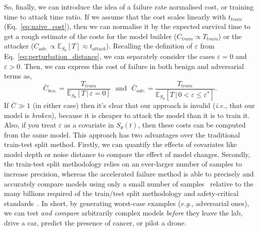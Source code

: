 So, finally, we can introduce the idea of a failure rate normalised cost, or training time to attack time ratio. If we assume that the cost scales linearly with $t_{train}$ (Eq.~\ref{eq:naive_cost}), then we can normalise it by the expected survival time to get a rough estimate of the costs for the model builder ($C_{train} \propto T_{train}$) or the attacker ($C_{adv.} \propto \mathbb{E}_{S_\theta}[T] \approx t_{attack}$). Recalling the definition of $\varepsilon$ from Eq.~\ref{eq:perturbation_distance}, we can separately consider the cases $\varepsilon=0$ and $\varepsilon > 0$. Then, we can express this cost of failure in both benign and adversarial terms as,
\begin{equation}
	\bar{C}_{ben.} = \frac{T_{train}}{\mathbb{E}_{S_\theta}[T \,|\, \varepsilon = 0] }
	\text{~~and~~}
	\bar{C}_{adv.}=\frac{T_{train}}{\mathbb{E}_{S_\theta}[T \,|\, 0 < \varepsilon \leq \varepsilon^*]}.
	\label{eq:cost}
\end{equation}
If $\bar{C} \gg 1$ (in either case) then it's clear that our approach is invalid (\textit{i.e.}, that our model is \textit{broken}), because it is cheaper to attack the model than it is to train it. Also, if you treat $\varepsilon$ as a covariate in ${S_\theta}(t)$, then these costs can be computed from the same model.
This approach has two advantages over the traditional train-test split method. Firstly, we can quantify the effects of covariates like model depth or noise distance to compare the effect of model changes. Secondly, the train-test split methodology relies on an ever-larger number of samples to increase precision, whereas the accelerated failure method is able to precisely and accurately compare models using only a small number of samples~\cite{schmoor2000sample,lachin1981introduction} relative to the many billions required of the train/test split methodology and safety-critical standards~\cite{iso26262,IEC61508,IEC62034,meyers}. 
In short, by generating worst-case examples (\textit{e.g.}, adversarial ones), we can test \textit{and compare} arbitrarily complex models \textit{before} they leave the lab, drive a car, predict the presence of cancer, or pilot a drone. 